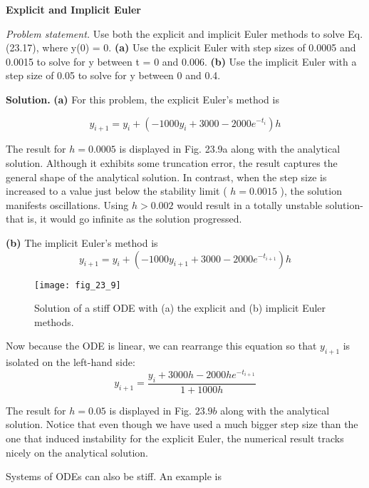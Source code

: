 \documentclass[../main.tex]{subfiles}
\begin{document}
\begin{exmp}
    \textbf{Explicit and Implicit Euler}

    \noindent \textit{Problem statement.} Use both the explicit and implicit Euler methods to solve Eq. (23.17), where y(0) = 0. \textbf{(a)} Use the explicit Euler with step sizes of 0.0005 and 0.0015 to solve for
    y between t = 0 and 0.006. \textbf{(b)} Use the implicit Euler with a step size of 0.05 to solve for y
    between 0 and 0.4.

    \noindent \textbf{Solution.} \quad \textbf{(a)} For this problem, the explicit Euler's method is

    \begin{equation}
        y_{i+1}=y_{i}+\left(-1000 y_{i}+3000-2000 e^{-t_{i}}\right) h \nonumber
    \end{equation}
    
    \noindent The result for $h=0.0005$ is displayed in Fig. 23.9a along with the analytical solution. Although it exhibits some truncation error, the result captures the general shape of the analytical solution. In contrast, when the step size is increased to a value just below the stability limit ( $h=0.0015$ ), the solution manifests oscillations. Using $h>0.002$ would result in a totally unstable solution-that is, it would go infinite as the solution progressed.

    \noindent \textbf{(b)} The implicit Euler's method is
    \begin{equation}
        y_{i+1}=y_{i}+\left(-1000 y_{i+1}+3000-2000 e^{-t_{i+1}}\right) h \nonumber
    \end{equation}
    
    \begin{figure}[H]
        \centering
        \texttt{[image: fig\_23\_9]}
       \caption{\textsf{Solution of a stiff ODE with (a) the explicit and (b) implicit Euler methods.}}\label{fig:fig_23_9}
    \end{figure}

    \noindent Now because the ODE is linear, we can rearrange this equation so that $y_{i+1}$ is isolated on the left-hand side:
    \begin{equation}
        y_{i+1}=\frac{y_{i}+3000 h-2000 h e^{-t_{i+1}}}{1+1000 h} \nonumber
    \end{equation}
    
    \noindent The result for $h=0.05$ is displayed in Fig. $23.9 b$ along with the analytical solution. Notice that even though we have used a much bigger step size than the one that induced instability for the explicit Euler, the numerical result tracks nicely on the analytical solution.
\end{exmp}
\vspace{1cm}
\noindent Systems of ODEs can also be stiff. An example is
\end{document}
